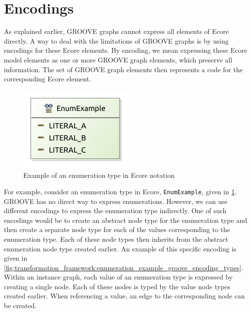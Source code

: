 \section{Encodings}
\label{sec:transformation_framework:encodings}
As explained earlier, GROOVE graphs cannot express all elements of Ecore directly. A way to deal with the limitations of GROOVE graphs is by using encodings for these Ecore elements. By encoding, we mean expressing these Ecore model elements as one or more GROOVE graph elements, which preserve all information. The set of GROOVE graph elements then represents a code for the corresponding Ecore element.

\begin{figure}
    \centering
    \includegraphics{images/04_transformation_framework/eenum.pdf}
    \caption{Example of an enumeration type in Ecore notation}
    \label{fig:transformation_framework:enumeration_example}
\end{figure}

For example, consider an enumeration type in Ecore, \texttt{EnumExample}, given in \cref{fig:transformation_framework:enumeration_example}. GROOVE has no direct way to express enumerations. However, we can use different encodings to express the enumeration type indirectly. One of such encodings would be to create an abstract node type for the enumeration type and then create a separate node type for each of the values corresponding to the enumeration type. Each of these node types then inherits from the abstract enumeration node type created earlier. An example of this specific encoding is given in \cref{fig:transformation_framework:enumeration_example_groove_encoding_types}. Within an instance graph, each value of an enumeration type is expressed by creating a single node. Each of these nodes is typed by the value node types created earlier. When referencing a value, an edge to the corresponding node can be created.

